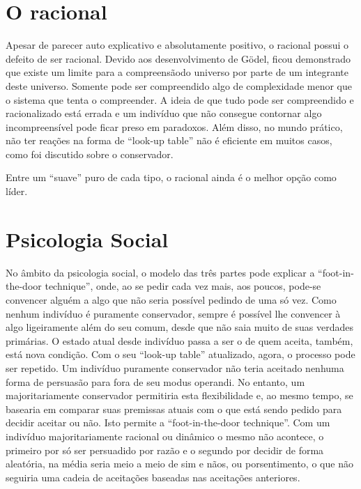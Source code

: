 \documentclass[14pt,portuguese]{extreport}
\begin{document}
    \section{O racional}
      
      Apesar de parecer auto explicativo e absolutamente positivo, o
      racional possui o defeito de ser racional. Devido aos desenvolvimento
      de Gödel, ficou demonstrado que existe um limite para a compreensãodo universo por parte de um integrante deste universo. Somente pode
      ser compreendido algo de complexidade menor que o sistema que tenta
      o compreender. A ideia de que tudo pode ser compreendido e
      racionalizado está errada e um indivíduo que não consegue contornar
      algo incompreensível pode ficar preso em paradoxos. Além disso, no
      mundo prático, não ter reações na forma de “look-up table” não é
      eficiente em muitos casos, como foi discutido sobre o conservador.
      
      Entre um “suave” puro de cada tipo, o racional ainda é o melhor
      opção como líder.
      
    \section{Psicologia Social}
    
      No âmbito da psicologia social, o modelo das três partes pode
      explicar a “foot-in-the-door technique”, onde, ao se pedir cada vez mais,
      aos poucos, pode-se convencer alguém a algo que não seria possível
      pedindo de uma só vez. Como nenhum indivíduo é puramente
      conservador, sempre é possível lhe convencer à algo ligeiramente além
      do seu comum, desde que não saia muito de suas verdades primárias. O
      estado atual desde indivíduo passa a ser o de quem aceita, também, está
      nova condição. Com o seu “look-up table” atualizado, agora, o processo
      pode ser repetido. Um indivíduo puramente conservador não teria
      aceitado nenhuma forma de persuasão para fora de seu modus
      operandi. No entanto, um majoritariamente conservador permitiria esta
      flexibilidade e, ao mesmo tempo, se basearia em comparar suas
      premissas atuais com o que está sendo pedido para decidir aceitar ou
      não. Isto permite a “foot-in-the-door technique”. Com um indivíduo
      majoritariamente racional ou dinâmico o mesmo não acontece, o
      primeiro por só ser persuadido por razão e o segundo por decidir de
      forma aleatória, na média seria meio a meio de sim e nãos, ou porsentimento, o que não seguiria uma cadeia de aceitações baseadas nas
      aceitações anteriores.
      
\end{document}
